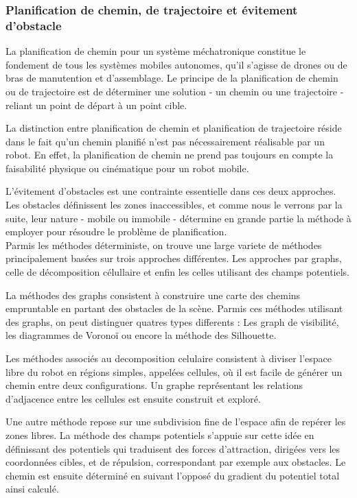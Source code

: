 \documentclass[../main.tex]{subfiles}
\begin{document}
\subsubsection{Planification de chemin, de trajectoire et évitement d'obstacle}

La planification de chemin pour un système méchatronique constitue le fondement de tous les systèmes mobiles autonomes, qu'il s'agisse de drones ou de bras de manutention et d'assemblage. Le principe de la planification de chemin ou de trajectoire est de déterminer une solution - un chemin ou une trajectoire - reliant un point de départ à un point cible.

La distinction entre planification de chemin et planification de trajectoire réside dans le fait qu'un chemin planifié n'est pas nécessairement réalisable par un robot. En effet, la planification de chemin ne prend pas toujours en compte la faisabilité physique ou cinématique pour un robot mobile.

L'évitement d'obstacles est une contrainte essentielle dans ces deux approches. Les obstacles définissent les zones inaccessibles, et comme nous le verrons par la suite, leur nature - mobile ou immobile - détermine en grande partie la méthode à employer pour résoudre le problème de planification.\\

Parmis les méthodes déterministe, on trouve une large variete de méthodes principalement basées sur trois approches différentes. Les approches par graphs, celle de décomposition célullaire et enfin les celles utilisant des champs potentiels.\cite{latombe_robot_1991,bhattacharyya_robot_2008}

La méthodes des graphs consistent à construire une carte des chemins empruntable en partant des obstacles de la scène. Parmis ces méthodes utilisant des graphs, on peut distinguer quatres types differents : Les graph de visibilité\cite{visibility_graph_1979}, les diagrammes de Voronoï \cite{garrido_path_2006} ou encore la méthode des Silhouette\cite{bhattacharyya_robot_2008}.

Les méthodes associés au decomposition celulaire consistent à diviser l'espace libre du robot en régions simples, appelées cellules, où il est facile de générer un chemin entre deux configurations. Un graphe représentant les relations d'adjacence entre les cellules est ensuite construit et exploré.\cite{latombe_robot_1991,zhu_new_1991,kedem_efficient_1990,avnaim_practical_1988}

Une autre méthode repose sur une subdivision fine de l'espace afin de repérer les zones libres. La méthode des champs potentiels s'appuie sur cette idée en définissant des potentiels qui traduisent des forces d'attraction, dirigées vers les coordonnées cibles, et de répulsion, correspondant par exemple aux obstacles. Le chemin est ensuite déterminé en suivant l'opposé du gradient du potentiel total ainsi calculé.\cite{latombe_robot_1991,koren_potential_1991}
\end{document}
